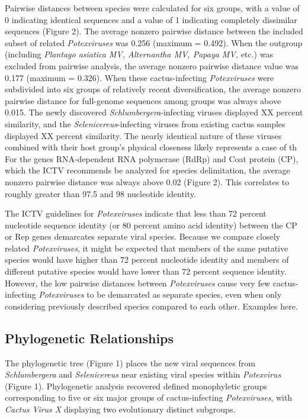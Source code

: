 \documentclass[11pt,letterpaper,titlepage]{article}
\begin{document}
\begin{linenumbers}
Pairwise distances between species were calculated for six groups, with a value of 0 indicating identical sequences and a value of 1 indicating completely dissimilar sequences (Figure 2). 
The average nonzero pairwise distance between the included subset of related \textit{Potexviruses} was 0.256 (maximum = 0.492). 
When the outgroup (including \textit{Plantago asiatica MV, Alternantha MV, Papaya MV,} etc.) was excluded from pairwise analysis, the average nonzero pairwise distance value was 0.177 (maximum = 0.326). 
When these cactus-infecting \textit{Potexviruses} were subdivided into six groups of relatively recent diversification, the average nonzero pairwise distance for full-genome sequences among groups was always above 0.015. 
The newly discovered \textit{Schlumbergera}-infecting viruses displayed XX percent similarity, and the \textit{Selenicereus}-infecting viruses from existing cactus samples displayed XX percent similarity.
The nearly identical nature of these viruses combined with their host group's physical closeness likely represents a case of th
For the genes RNA-dependent RNA polymerase (RdRp) and Coat protein (CP), which the ICTV recommends be analyzed for species delimitation, the average nonzero pairwise distance was always above 0.02 (Figure 2). 
This correlates to roughly greater than 97.5 and 98 nucleotide identity. 

The ICTV guidelines for \textit{Potexviruses} indicate that less than 72 percent nucleotide sequence identity (or 80 percent amino acid identity) between the CP or Rep genes demarcates separate viral species.
Because we compare closely related \textit{Potexviruses}, it might be expected that members of the same putative species would have higher than 72 percent nucleotide identity and members of different putative species would have lower than 72 percent sequence identity.
However, the low pairwise distances between \textit{Potexviruses} cause very few cactus-infecting \textit{Potexviruses} to be demarcated as separate species, even when only considering previously described species compared to each other.
Examples here.


\subsection*{Phylogenetic Relationships}
The phylogenetic tree (Figure 1) places the new viral sequences from \textit{Schlumbergera} and \textit{Selenicereus} near existing viral species within \textit{Potexvirus} (Figure 1). 
Phylogenetic analysis recovered defined monophyletic groups corresponding to five or six major groups of cactus-infecting \textit{Potexviruses}, with \textit{Cactus Virus X} displaying two evolutionary distinct subgroups. 



\end{linenumbers}
\end{document}
